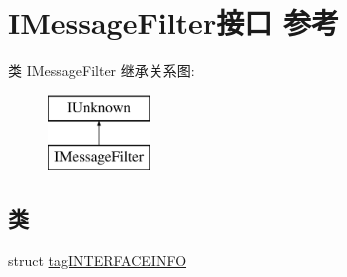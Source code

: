 \hypertarget{interface_i_message_filter}{}\section{I\+Message\+Filter接口 参考}
\label{interface_i_message_filter}
类 I\+Message\+Filter 继承关系图\+:\begin{figure}[H]
\begin{center}
\leavevmode
\includegraphics[height=2.000000cm]{interface_i_message_filter}
\end{center}
\end{figure}
\subsection*{类}
\begin{DoxyCompactItemize}
\item 
struct \hyperlink{struct_i_message_filter_1_1tag_i_n_t_e_r_f_a_c_e_i_n_f_o}{tag\+I\+N\+T\+E\+R\+F\+A\+C\+E\+I\+N\+FO}
\end{DoxyCompactItemize}
